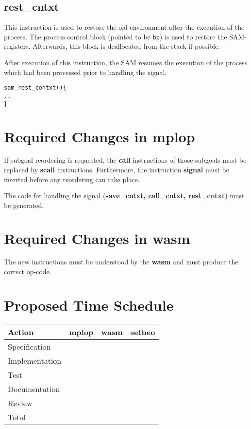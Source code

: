 \subsection{rest\_cntxt}
This instruction is used to restore the old environment after the execution of
the process. The process control block (pointed to be {\tt bp}) is
used to restore the SAM-registers.
Afterwards, this block is deallocated from the stack if possible.

After execution of this instruction, the SAM resumes the execution of the
process which had been processed prior to handling the signal.

\begin{verbatim}
sam_rest_contxt(){
..
}
\end{verbatim}

\section{Required Changes in mplop}

If subgoal reordering is requested, the {\bf call} instructions of those
subgoals must be replaced by {\bf scall} instructions.
Furthermore, the instruction {\bf signal} must be inserted before any
reordering can take place.

The code for handling the signal ({\bf save\_cntxt, call\_cntxt, rest\_cntxt})
must be generated.


\section{Required Changes in wasm}

The new instructions must be understood by the {\bf wasm} and must produce
the correct op-code.



\section{Proposed Time Schedule}

\begin{center}
\begin{tabular}{|l|r|r|r|}
\hline\hline
Action & mplop & wasm & setheo \\
\hline
Specification & & & \\
Implementation & & & \\
Test & & & \\
Documentation & & & \\
Review & & & \\
\hline
Total & & & \\
\hline\hline
\end{tabular}
\end{center}
